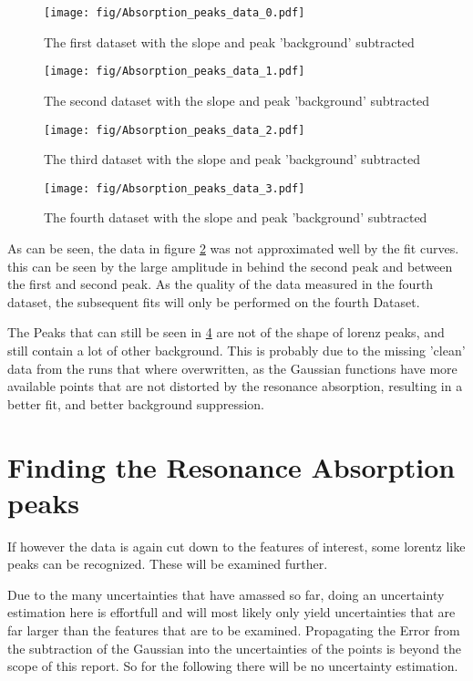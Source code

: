 \begin{figure}[tb]
	\texttt{[image: fig/Absorption\_peaks\_data\_0.pdf]}
	\caption{The first dataset with the slope and peak 'background' subtracted}
	\label{fig:data_0_absorption}
\end{figure}
\begin{figure}[tb]
	\texttt{[image: fig/Absorption\_peaks\_data\_1.pdf]}
	\caption{The second dataset with the slope and peak 'background' subtracted}
	\label{fig:data_1_absorption}
\end{figure}
\begin{figure}[tb]
	\texttt{[image: fig/Absorption\_peaks\_data\_2.pdf]}
	\caption{The third dataset with the slope and peak 'background' subtracted}
	\label{fig:data_2_absorption}
\end{figure}
\begin{figure}[tb]
	\texttt{[image: fig/Absorption\_peaks\_data\_3.pdf]}
	\caption{The fourth dataset with the slope and peak 'background' subtracted}
	\label{fig:data_3_absorption}
\end{figure}

As can be seen, the data in figure \ref{fig:data_1_absorption} was not approximated well by the fit curves. this can be seen by the large amplitude in
behind the second peak and between the first and second peak. As the quality of the data measured in the fourth dataset, the subsequent fits will only
be performed on the fourth Dataset.

The Peaks that can still be seen in \ref{fig:data_3_absorption} are not of the shape of lorenz peaks, and still contain a lot of other background.
This is probably due to the missing 'clean' data from the runs that where overwritten, as the Gaussian functions have more available points that are
not distorted by the resonance absorption, resulting in a better fit, and better background suppression.

\section{Finding the Resonance Absorption peaks}
If however the data is again cut down to the features of interest, some lorentz like peaks can be recognized.
These will be examined further.

Due to the many uncertainties that have amassed so far, doing an uncertainty estimation here is effortfull and will most likely only yield
uncertainties that are far larger than the features that are to be examined. Propagating the Error from the subtraction of the Gaussian into the
uncertainties of the points is beyond the scope of this report. So for the following there will be no uncertainty estimation.

